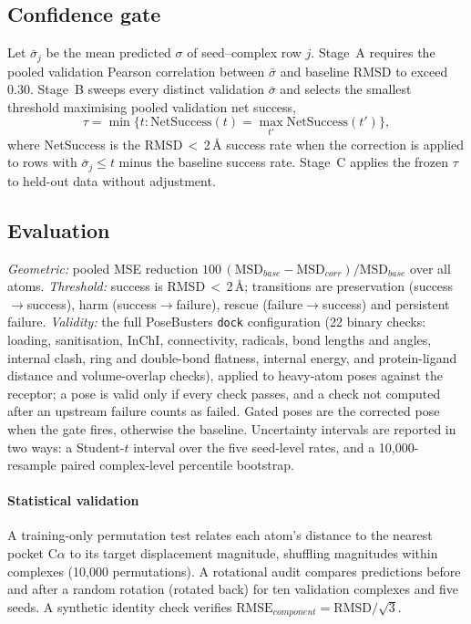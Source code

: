 \subsection{Confidence gate}
Let $\bar\sigma_j$ be the mean predicted $\sigma$ of seed--complex row $j$. Stage~A requires the pooled validation Pearson
correlation between $\bar\sigma$ and baseline RMSD to exceed 0.30. Stage~B sweeps every distinct validation $\bar\sigma$
and selects the smallest threshold maximising pooled validation net success,
\begin{equation}
\tau = \min\{t : \mathrm{NetSuccess}(t) = \max_{t'} \mathrm{NetSuccess}(t')\},
\end{equation}
where NetSuccess is the RMSD\,$<$\,2\,\AA{} success rate when the correction is applied to rows with $\bar\sigma_j \le t$
minus the baseline success rate. Stage~C applies the frozen $\tau$ to held-out data without adjustment.

\subsection{Evaluation}
\emph{Geometric:} pooled MSE reduction $100\,(\mathrm{MSD}_{base}-\mathrm{MSD}_{corr})/\mathrm{MSD}_{base}$ over all atoms.
\emph{Threshold:} success is RMSD\,$<$\,2\,\AA{}; transitions are preservation (success$\to$success), harm (success$\to$failure),
rescue (failure$\to$success) and persistent failure. \emph{Validity:} the full PoseBusters \texttt{dock} configuration
(22 binary checks: loading, sanitisation, InChI, connectivity, radicals, bond lengths and angles, internal clash, ring
and double-bond flatness, internal energy, and protein-ligand distance and volume-overlap checks), applied to heavy-atom
poses against the receptor; a pose is valid only if every check passes, and a check not computed after an upstream
failure counts as failed. Gated poses are the corrected pose when the gate fires, otherwise the baseline. Uncertainty
intervals are reported in two ways: a Student-$t$ interval over the five seed-level rates, and a 10{,}000-resample paired
complex-level percentile bootstrap.

\paragraph{Statistical validation} A training-only permutation test relates each atom's distance to the nearest pocket
C$\alpha$ to its target displacement magnitude, shuffling magnitudes within complexes (10{,}000 permutations). A rotational
audit compares predictions before and after a random rotation (rotated back) for ten validation complexes and five seeds.
A synthetic identity check verifies $\mathrm{RMSE}_{component} = \mathrm{RMSD}/\sqrt{3}$.

